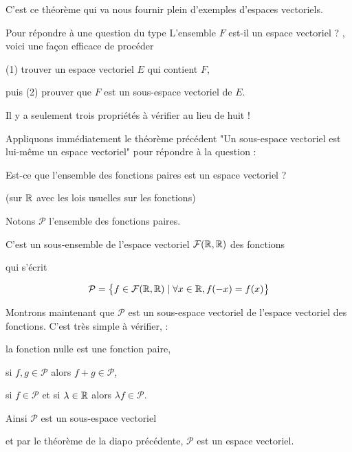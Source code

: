 C'est ce théorème qui va nous fournir plein d'exemples d'espaces vectoriels.

\change


Pour répondre à une question du type \og L'ensemble $F$ est-il un espace vectoriel ? \fg,
voici une façon efficace de procéder

(1) trouver un espace vectoriel $E$ qui contient $F$, 


puis (2) prouver que $F$ est un sous-espace vectoriel de $E$.



Il y a seulement trois propriétés à vérifier au lieu de huit !



\diapo

Appliquons immédiatement le théorème précédent "Un sous-espace vectoriel est lui-même un espace vectoriel"
pour répondre à la question :

Est-ce que l'ensemble des fonctions paires  est un espace vectoriel ?
 
(sur $\mathbb{R}$ avec les lois usuelles sur les fonctions) 

  Notons $\mathcal{P}$ l'ensemble des fonctions paires. 
  

\change

  
C'est un sous-ensemble de l'espace vectoriel $\mathcal{F}(\mathbb{R},\mathbb{R})$ des fonctions 

\change

  qui s'écrit
 
 $$ \mathcal{P}=\big\{ f \in \mathcal{F}(\mathbb{R}, \mathbb{R} ) \mid \forall x \in \mathbb{R} , f(-x)=f(x) \big\}$$
 
\change

 Montrons maintenant que $\mathcal{P}$ est un sous-espace vectoriel de l'espace vectoriel des fonctions. 
 C'est très simple à vérifier, :
 
 \change

 la fonction nulle est une fonction paire,   
 
 \change

 si $f,g \in \mathcal{P}$ alors $f+g \in\mathcal{P}$,
 
 \change
 
  si $f\in\mathcal{P}$ et si $\lambda \in \mathbb{R}$ alors $\lambda f\in\mathcal{P}$.
  
  \change
  
  Ainsi $\mathcal{P}$ est un sous-espace vectoriel 
  
  et par le théorème de la diapo précédente, $\mathcal{P}$ est un espace vectoriel.
  

